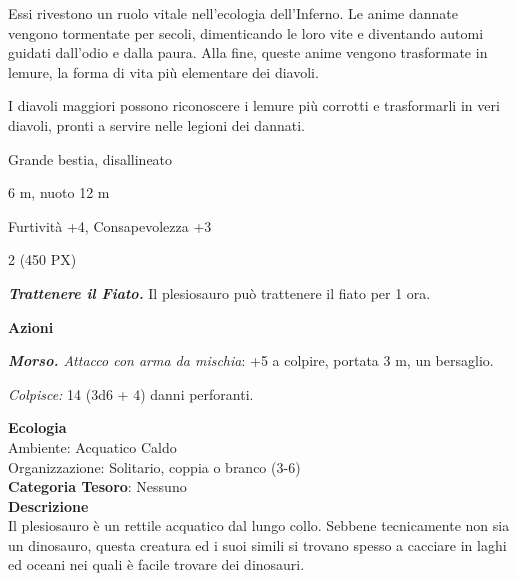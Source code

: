\begin{multicols}{2}
{Essi rivestono un ruolo vitale nell'ecologia dell'Inferno. Le anime dannate vengono tormentate per secoli, dimenticando le loro vite e diventando automi guidati dall'odio e dalla paura. Alla fine, queste anime vengono trasformate in lemure, la forma di vita più elementare dei diavoli.

I diavoli maggiori possono riconoscere i lemure più corrotti e trasformarli in veri diavoli, pronti a servire nelle legioni dei dannati.

\begin{description}[noitemsep, topsep=0pt, parsep=0pt, partopsep=0pt, itemsep=1pt, leftmargin=2.35cm,  labelwidth=2.2cm, itemindent=0cm, listparindent=0pt] %
\setlength{\baselineskip}{10pt}
\item[\textbf{Taglia/Tipo}] Grande bestia, disallineato
\item[\textbf{Caratt.}] 
\item[\textbf{Punti Ferita}] 
\item[\textbf{Movimento}] 6 m, nuoto 12 m
\item[\textbf{Tiri Salvez.}] 
\item[\textbf{Comp.}] Furtività +4, Consapevolezza +3
\item[\textbf{Sfida}] 2 (450 PX)
\end{description}
\smallskip

\emph{\textbf{Trattenere il Fiato.}} Il plesiosauro può trattenere il fiato per 1 ora.

\textbf{Azioni}

\emph{\textbf{Morso.} Attacco con arma da mischia}: +5 a colpire, portata 3 m, un bersaglio.

\emph{Colpisce:} 14 (3d6 + 4) danni perforanti.

\textbf{Ecologia}\\
Ambiente: Acquatico Caldo\\
Organizzazione: Solitario, coppia o branco (3-6)\\
\textbf{Categoria Tesoro}: Nessuno\\
\textbf{Descrizione}\\
Il plesiosauro è un rettile acquatico dal lungo collo. Sebbene tecnicamente non sia un dinosauro, questa creatura ed i suoi simili si trovano spesso a cacciare in laghi ed oceani nei quali è facile trovare dei dinosauri.

}
\end{multicols}
